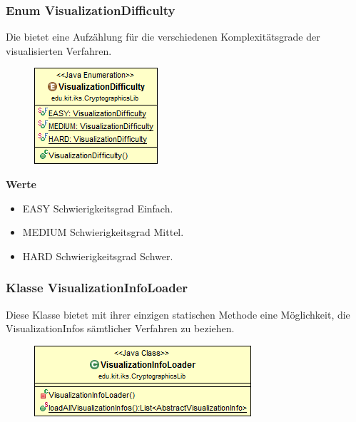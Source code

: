 \documentclass{article}
\begin{document}
	\subsubsection{Enum VisualizationDifficulty}
	  Die bietet eine Aufzählung für die verschiedenen Komplexitätsgrade der visualisierten Verfahren.
	
      \begin{figure}[H]
        \centering
        \includegraphics{resources/edu-kit-iks-CryptographicsLib-VisualizationDifficulty}
      \end{figure}

      \textbf{Werte}
      \begin{itemize}
        \item EASY \newline
          Schwierigkeitsgrad \glqq Einfach\grqq.
        \item MEDIUM \newline
          Schwierigkeitsgrad \glqq Mittel\grqq.
        \item HARD \newline
          Schwierigkeitsgrad \glqq Schwer\grqq.
      \end{itemize}
	
	\subsubsection{Klasse VisualizationInfoLoader}
	  Diese Klasse bietet mit ihrer einzigen statischen Methode eine Möglichkeit, 
	  die VisualizationInfos sämtlicher Verfahren zu beziehen.
	
      \begin{figure}[H]
        \centering
        \includegraphics{resources/edu-kit-iks-CryptographicsLib-VisualizationInfoLoader}
      \end{figure}
	
\end{document}
